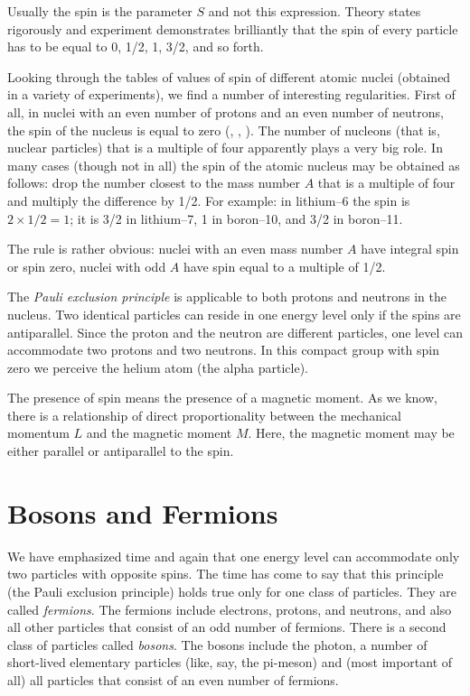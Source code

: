 Usually the spin is the parameter $S$ and not this ex­pression. Theory states rigorously and experiment demon­strates brilliantly that the spin of every particle has to be equal to 0, 1/2, 1, 3/2, and so forth.

Looking through the tables of values of spin of different atomic nuclei (obtained in a variety of experiments), we find a number of interesting regularities. First of all, in nuclei with an even number of protons and an even number of neutrons, the spin of the nucleus is equal to zero (, , ). The number of nucleons (that is, nuclear particles) that is a multiple of four apparently plays a very big role. In many cases (though not in all) the spin of the atomic nucleus may be obtained as follows: drop the number closest to the mass number $A$ that is a multiple of four and multiply the difference by 1/2. For example: in lithium--6 the spin is $2 \times 1/2 = 1$; it is 3/2 in lithium--7, 1 in boron--10, and 3/2 in boron--11.

The rule is rather obvious: nuclei with an even mass number $A$ have integral spin or spin zero, nuclei with odd $A$ have spin equal to a multiple of 1/2.

The \emph{Pauli exclusion principle} is applicable to both protons and neutrons in the nucleus. Two identical parti­cles can reside in one energy level only if the spins are antiparallel. Since the proton and the neutron are different particles, one level can accommodate two protons and two neutrons. In this compact group with spin zero we perceive the helium atom (the alpha particle).

The presence of spin means the presence of a magnetic moment. As we know, there is a relationship of direct proportionality between the mechanical momentum $L$ and the magnetic moment $M$. Here, the magnetic moment may be either parallel or antiparallel to the spin.

\section{Bosons and Fermions}
We have emphasized time and again that one energy level can accommodate only two particles with opposite spins. The time has come to say that this principle (the Pauli exclusion principle) holds true only for one class of particles. They are called \emph{fermions}. The fermions in­clude electrons, protons, and neutrons, and also all other particles that consist of an odd number of fermions. There is a second class of particles called \emph{bosons}. The bosons include the photon, a number of short-lived elementary particles (like, say, the pi-meson) and (most im­portant of all) all particles that consist of an even number of fermions.

